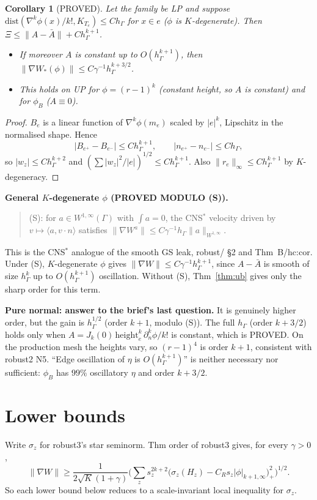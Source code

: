 \documentclass[11pt]{article}
\newtheorem{corollary}[theorem]{Corollary}
\theoremstyle{remark}
\newcommand{\hG}{h_\Gamma}
\newcommand{\ip}[2]{\langle #1,#2\rangle}
\begin{document}
\begin{corollary}[PROVED]\label{thm:up}
Let the family be LP and suppose $\mathrm{dist}(\nabla^k\phi(x)/k!,K_{T_e})\le C\hG$ for $x\in e$ ($\phi$ is
\emph{$K$-degenerate}). Then $\Xi\le\|A-\bar A\|+C\hG^{k+1}$.
\begin{itemize}
\item If moreover $A$ is constant up to $O(\hG^{k+1})$, then $\|\nabla W_\ast(\phi)\|\le C\gamma^{-1}\hG^{k+3/2}$.
\item This holds on \textsf{UP} for $\phi=(r-1)^k$ (constant height, so $A$ is constant) and for $\phi_B$ ($A\equiv0$).
\end{itemize}
\end{corollary}
\begin{proof}
$B_e$ is a linear function of $\nabla^k\phi(m_e)$ scaled by $|e|^k$, Lipschitz in the normalised shape. Hence
\[
|B_{e^+}-B_{e^-}|\le C\hG^{k+1},\qquad |n_{e^+}-n_{e^-}|\le C\hG,
\]
so $|w_z|\le C\hG^{k+2}$ and $(\sum|w_z|^2/|e|)^{1/2}\le C\hG^{k+1}$. Also $\|r_e\|_\infty\le C\hG^{k+1}$ by
$K$-degeneracy.
\end{proof}

\noindent\textbf{General $K$-degenerate $\phi$ (PROVED MODULO (S)).}
\begin{quote}
(S): for $a\in W^{1,\infty}(\Gamma)$ with $\int a=0$, the CNS$^\ast$ velocity driven by $v\mapsto\ip{a}{v\cdot n}$ satisfies
$\|\nabla W^a\|\le C\gamma^{-1}\hG\|a\|_{W^{1,\infty}}$.
\end{quote}
This is the CNS$^\ast$ analogue of the smooth GS leak, robust/ §2 and Thm~B/hc:cor. Under (S), $K$-degenerate $\phi$ gives
$\|\nabla W\|\le C\gamma^{-1}\hG^{k+1}$, since $A-\bar A$ is smooth of size $\hG^k$ up to $O(\hG^{k+1})$ oscillation. Without
(S), Thm~\ref{thm:ub} gives only the sharp order for this term.

\noindent\textbf{Pure normal: answer to the brief's last question.} It is genuinely higher order, but the gain is $\hG^{1/2}$
(order $k+1$, modulo (S)). The full $\hG$ (order $k+3/2$) holds only when $A=J_k(0)\,\mathrm{height}_e^k\,\partial_n^k\phi/k!$ is
constant, which is PROVED. On the production mesh the heights vary, so $(r-1)^4$ is order $k+1$, consistent with robust2 N5.
``Edge oscillation of $\eta$ is $O(\hG^{k+1})$'' is neither necessary nor sufficient: $\phi_B$ has $99\%$ oscillatory $\eta$
and order $k+3/2$.

\section{Lower bounds}
Write $\sigma_z$ for robust3's star seminorm. Thm order of robust3 gives, for every $\gamma>0$,
\[
\|\nabla W\|\ge\frac1{2\sqrt K(1+\gamma)}\Big(\sum_z s_z^{2k+2}\big(\sigma_z(H_z)-C_Rs_z|\phi|_{k+1,\infty}\big)_+^2\Big)^{1/2}.
\]
So each lower bound below reduces to a scale-invariant local inequality for $\sigma_z$.
\end{document}
